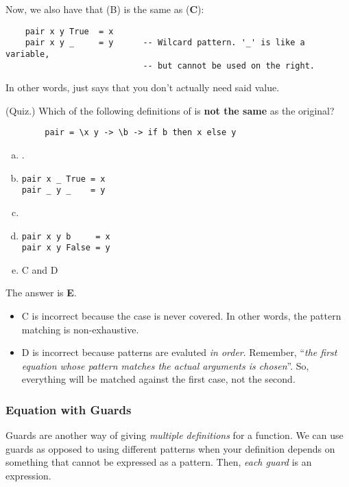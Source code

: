\documentclass[letterpaper]{article}
\begin{document}
\bigskip 

Now, we also have that (B) is the same as (\textbf{C}): 
\begin{verbatim}
    pair x y True  = x      
    pair x y _     = y      -- Wilcard pattern. '_' is like a variable,
                            -- but cannot be used on the right. \end{verbatim}
In other words, \code{\_} just says that you don't actually need said value. 

\begin{mdframed}[]
    (Quiz.) Which of the following definitions of  is \textbf{not the same} as the original? 
    \begin{verbatim}
        pair = \x y -> \b -> if b then x else y \end{verbatim} 

    \begin{enumerate}[(a)]
        \item {}.
        \item \begin{verbatim}
pair x _ True = x 
pair _ y _    = y\end{verbatim}
        \item {}
        \item \begin{verbatim}
pair x y b     = x
pair x y False = y  \end{verbatim}
        \item C and D 
    \end{enumerate}

    \begin{mdframed}[]
        The answer is \textbf{E}. 
        \begin{itemize}
            \item C is incorrect because the  case is never covered. In other words, the pattern matching is non-exhaustive. 
            \item D is incorrect because patterns are evaluted \emph{in order}. Remember, ``\emph{the first equation whose pattern matches the actual arguments is chosen}''. So, everything will be matched against the first case, not the second.
        \end{itemize}
    \end{mdframed}
\end{mdframed}

\subsubsection{Equation with Guards}
Guards are another way of giving \emph{multiple definitions} for a function. We can use guards as opposed to using different patterns when your definition depends on something that cannot be expressed as a pattern. Then, \emph{each guard} is an expression.
\end{document}
